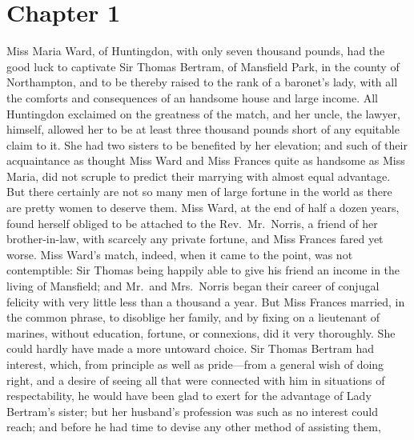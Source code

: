 %
%











\chapter{Chapter 1}

 Miss Maria Ward, of Huntingdon,
with only seven thousand pounds, had the good luck
to captivate Sir Thomas Bertram, of Mansfield Park,
in the county of Northampton, and to be thereby raised
to the rank of a baronet's lady, with all the comforts
and consequences of an handsome house and large income.
All Huntingdon exclaimed on the greatness of the match,
and her uncle, the lawyer, himself, allowed her to be at least
three thousand pounds short of any equitable claim to it.
She had two sisters to be benefited by her elevation;
and such of their acquaintance as thought Miss Ward and Miss
Frances quite as handsome as Miss Maria, did not scruple
to predict their marrying with almost equal advantage.
But there certainly are not so many men of large fortune
in the world as there are pretty women to deserve them.
Miss Ward, at the end of half a dozen years, found
herself obliged to be attached to the Rev.\ Mr.\ Norris,
a friend of her brother-in-law, with scarcely any
private fortune, and Miss Frances fared yet worse.
Miss Ward's match, indeed, when it came to the point,
was not contemptible:  Sir Thomas being happily able
to give his friend an income in the living of Mansfield;
and Mr.\ and Mrs.\ Norris began their career of conjugal
felicity with very little less than a thousand a year.
But Miss Frances married, in the common phrase,
to disoblige her family, and by fixing on a lieutenant
of marines, without education, fortune, or connexions,
did it very thoroughly.  She could hardly have made
a more untoward choice.  Sir Thomas Bertram had interest,
which, from principle as well as pride---from a general
wish of doing right, and a desire of seeing all that were
connected with him in situations of respectability,
he would have been glad to exert for the advantage
of Lady Bertram's sister; but her husband's profession
was such as no interest could reach; and before he
had time to devise any other method of assisting them,
